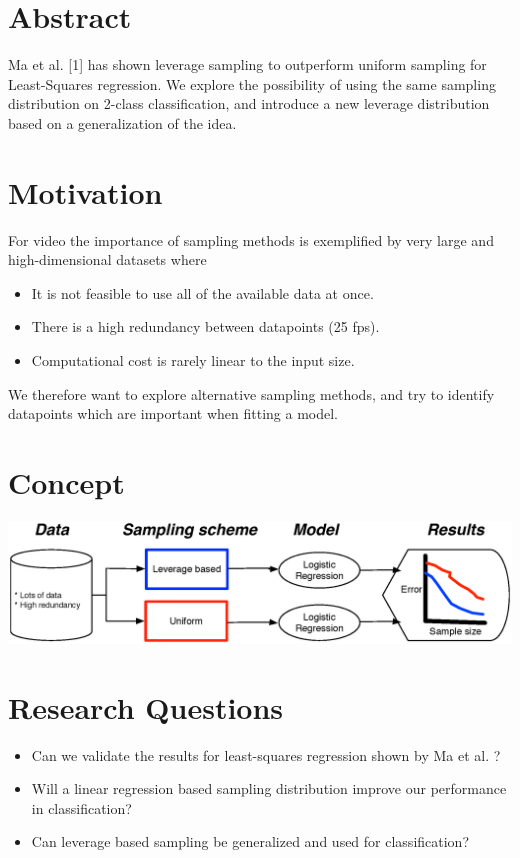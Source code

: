 %
\section{Abstract}
%
Ma et al. [1] has shown leverage sampling to outperform uniform sampling for Least-Squares regression. We explore the possibility of using the same sampling distribution on 2-class classification, and introduce a new leverage distribution based on a generalization of the idea.
%
\section{Motivation}
For video the importance of sampling methods is exemplified by very large and high-dimensional datasets where
\smallskip
\begin{itemize}
\item It is not feasible to use all of the available data at once.
\item There is a high redundancy between datapoints (25 fps).
\item Computational cost is rarely linear to the input size.
\end{itemize}
\smallskip
We therefore want to explore alternative sampling methods, and try to identify datapoints which are important when fitting a model.
%
\section{Concept}
\begin{center}
\includegraphics[width=.95\linewidth]{./02460_poster_template/images/ThoughtModel.eps}
\end{center}
%
\section{Research Questions}
\begin{itemize}
	\item Can we validate the results for least-squares regression shown by Ma et al. ?
	\item Will a linear regression based sampling distribution improve our performance in classification?
	\item Can leverage based sampling be generalized and used for classification?
\end{itemize}
%
